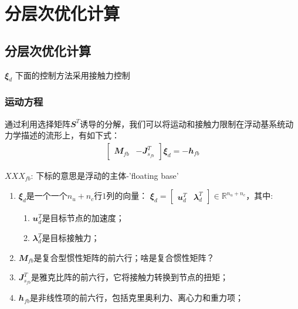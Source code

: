 
\chapter{分层次优化计算}


\section{分层次优化计算}
${\mathbfit \xi}_d$
下面的控制方法采用接触力控制

\subsection{运动方程}

通过利用选择矩阵$\mathbfit{S}^T$诱导的分解，我们可以将运动和接触力限制在浮动基系统动力学描述的流形上，有如下式\cite[p2]{Bellicoso_Jenelten_Fankhauser_Gehring_Hwangbo_Hutter_2017}：
\begin{align}
    \begin{bmatrix}{\mathbfit M}_{fb} & - {\mathbfit J}_{s_{fb}}^T \end{bmatrix} {\mathbfit \xi}_d = - {\mathbfit h}_{fb}
\end{align}

\begin{note}
    $XXX_{fb}$: 下标的意思是浮动的主体-'floating base'
\end{note}

\begin{enumerate}
    \item ${\mathbfit \xi}_d$是一个一个$n_u+n_c$行$1$列的向量： ${\mathbfit \xi}_d = \begin{bmatrix} {\mathbfit u}_d^T & {\mathbfit \lambda}_d^T \end{bmatrix} \in {\mathbb R}^{n_u+n_c}$，其中:
    \begin{enumerate}
        \item ${\mathbfit u}_d^T$是目标节点的加速度；
        \item ${\mathbfit \lambda}_d^T$是目标接触力；
    \end{enumerate}
    \item ${\mathbfit M}_{fb}$是复合型惯性矩阵的前六行；啥是复合惯性矩阵？
    \item ${\mathbfit J}_{s_{fb}}^T$是雅克比阵的前六行，它将接触力转换到节点的扭矩；
    \item ${\mathbfit h}_{fb}$是非线性项的前六行，包括克里奥利力、离心力和重力项；
\end{enumerate}
